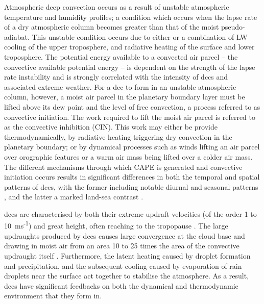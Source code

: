 Atmospheric deep convection occurs as a result of unstable atmospheric temperature and humidity profiles; a condition which occurs when the lapse rate of a dry atmospheric column becomes greater than that of the moist pseudo-adiabat.
This unstable condition occurs due to either or a combination of LW cooling of the upper troposphere, and radiative heating of the surface and lower troposphere.
The potential energy available to a convected air parcel -- the convective available potential energy -- is dependent on the strength of the lapse rate instability and is strongly correlated with the intensity of \acrshort{dcc}s and associated extreme weather.
For a \acrshort{dcc} to form in an unstable atmospheric column, however, a moist air parcel in the planetary boundary layer must be lifted above its dew point and the level of free convection, a process referred to as convective initiation.
The work required to lift the moist air parcel is referred to as the convective inhibition (CIN).
This work may either be provide thermodynamically, by radiative heating triggering dry convection in the planetary boundary; or by dynamical processes such as winds lifting an air parcel over orographic features or a warm air mass being lifted over a colder air mass.
The different mechanisms through which CAPE is generated and convective initiation occurs results in significant differences in both the temporal and spatial patterns of \acrshort{dcc}s, with the former including notable diurnal and seasonal patterns \citep{chen_diurnal_1997}, and the latter a marked land-sea contrast \citep{taylor_evaluating_2017}.

\acrshort{dcc}s are characterised by both their extreme updraft velocities (of the order 1 to 10~ms\textsuperscript{-1}) and great height, often reaching to the tropopause \citep{weisman_mesoscale_2015}.
The large updraughts produced by \acrshort{dcc}s causes large convergence at the cloud base and drawing in moist air from an area 10 to 25 times the area of the convective updraught itself \citep{trenberth_changing_2003}.
Furthermore, the latent heating caused by droplet formation and precipitation, and the subsequent cooling caused by evaporation of rain droplets near the surface act together to stabilise the atmosphere.
As a result, \acrshort{dcc}s have significant feedbacks on both the dynamical and thermodynamic environment that they form in.

